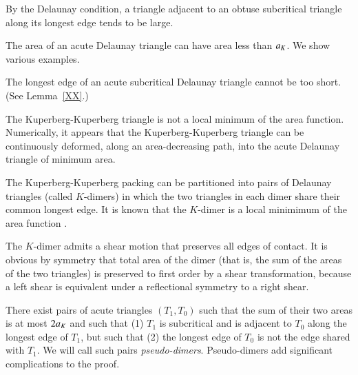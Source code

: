 \begin{example} By the Delaunay condition, a triangle adjacent to an obtuse subcritical
triangle along its longest edge tends to be large.
\end{example}

\begin{example} The area of an acute Delaunay triangle can have area less than
$a_K$.  We show various examples.
\end{example}

\begin{example} The longest edge of an acute subcritical Delaunay triangle cannot be too short.
(See Lemma~\ref{XX}.)
\end{example}

\begin{example}  The Kuperberg-Kuperberg triangle is not a local minimum of the area function.
Numerically, it appears that the Kuperberg-Kuperberg triangle can be continuously deformed, along an area-decreasing
path, into the acute Delaunay triangle of minimum area.
\end{example}

\begin{example}  The Kuperberg-Kuperberg packing can be partitioned into pairs
of Delaunay triangles (called $K$-dimers) in which the two triangles
in each dimer share their common longest edge.  It is known that the $K$-dimer is a local
minimimum of the area function \cite{Kus}.
\end{example}

\begin{example} The $K$-dimer admits a shear motion that preserves all edges of contact.
It is obvious by symmetry that total area of the dimer (that is, the sum of the areas of the two triangles)
is preserved to first order by a shear transformation, 
because a left shear is equivalent under a reflectional symmetry to a right shear.
\end{example}

\begin{example} There exist pairs of acute triangles $(T_1,T_0)$ such that the sum of their two areas
 is at most $2a_K$ and such that (1) $T_1$ is subcritical and is adjacent to $T_0$ 
along the longest edge of $T_1$, but such that (2) the longest edge of $T_0$ is 
not the edge shared with $T_1$.  We will call such pairs {\it pseudo-dimers}.
 Pseudo-dimers add significant complications to the proof.
\end{example}

